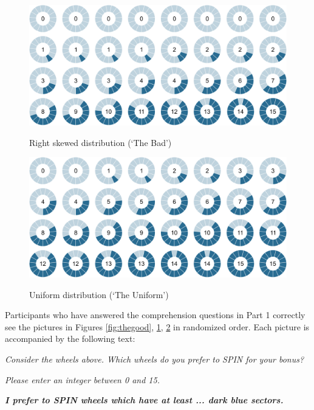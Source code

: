 \begin{figure}[h!]
  \centering
 {\includegraphics[width=0.95\linewidth]{Right_15.png}}
  \caption{Right skewed distribution (`The Bad')}
  \label{fig:thebad}
\end{figure}


\begin{figure}[h!]
  \centering
 {\includegraphics[width=0.95\linewidth]{Uniform_15.png}}
  \caption{Uniform distribution (`The Uniform')}
  \label{fig:theuniform}
\end{figure}

Participants who have answered the comprehension questions in Part 1 correctly see the pictures  in Figures \ref{fig:thegood}, \ref{fig:thebad}, \ref{fig:theuniform} in randomized order.
Each picture is accompanied by the following text:

\textit{Consider the wheels above. Which wheels do you prefer to SPIN for your bonus?}

\textit{{\small Please enter an integer between 0 and 15.}}

\textbf{\textit{I prefer to SPIN wheels which have at least ... dark blue sectors.}}

